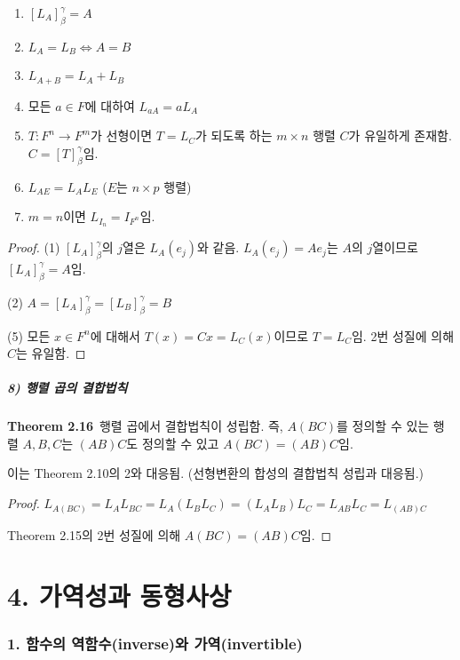 \documentclass[10pt, a4paper]{article}
\begin{document}
\begin{enumerate}
    \item $[L_A]_{\beta}^{\gamma}=A$
    \item $L_A=L_B \Longleftrightarrow A=B$
    \item $L_{A+B}=L_A+L_B$
    \item 모든 $a \in F$에 대하여 $L_{aA}=aL_A$
    \item $T:F^n \rightarrow F^m$가 선형이면 $T=L_C$가 되도록 하는 $m \times n$ 행렬 $C$가 유일하게 존재함. $C=[T]_{\beta}^{\gamma}$임.
    \item $L_{AE}=L_{A}L_{E}$ ($E$는 $n \times p$ 행렬)
    \item $m=n$이면 $L_{I_n}=I_{F^n}$임.
\end{enumerate}

\begin{proof}
    (1) $[L_A]_{\beta}^{\gamma}$의 $j$열은 $L_A(e_j)$와 같음. $L_A(e_j)=Ae_j$는 $A$의 $j$열이므로 $[L_A]_{\beta}^{\gamma}=A$임.
    
    (2) $A=[L_A]_{\beta}^{\gamma}=[L_B]_{\beta}^{\gamma}=B$
    
    (5) 모든 $x \in F^n$에 대해서 $T(x)=Cx=L_C(x)$이므로 $T=L_C$임. 2번 성질에 의해 $C$는 유일함.
\end{proof}

\subsubsection*{8) 행렬 곱의 결합법칙}
\textbf{Theorem 2.16}\, 행렬 곱에서 결합법칙이 성립함. 즉, $A(BC)$를 정의할 수 있는 행렬 $A,B,C$는 $(AB)C$도 정의할 수 있고 $A(BC)=(AB)C$임.

이는 Theorem 2.10의 2와 대응됨. (선형변환의 합성의 결합법칙 성립과 대응됨.)

\begin{proof}
$L_{A(BC)}=L_{A}L_{BC}=L_{A}(L_{B}L_{C})=(L_{A}L_{B})L_{C}=L_{AB}L_{C}=L_{(AB)C}$

Theorem 2.15의 2번 성질에 의해 $A(BC)=(AB)C$임.
\end{proof}


\newpage


\part*{4. 가역성과 동형사상}

\section*{1. 함수의 역함수(inverse)와 가역(invertible)}
\end{document}
